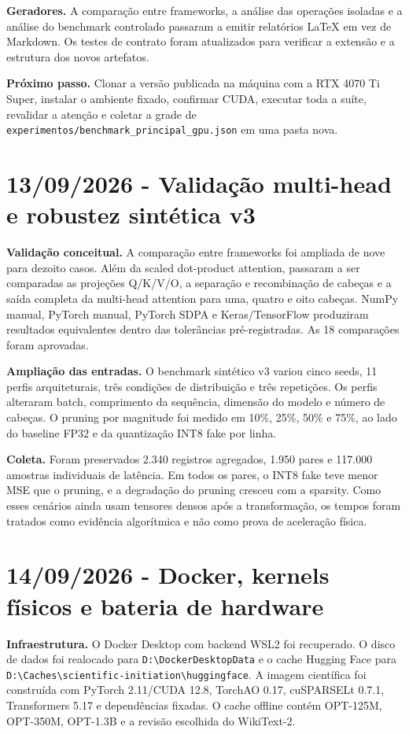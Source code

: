 \textbf{Geradores.} A comparação entre frameworks, a análise das operações
isoladas e a análise do benchmark controlado passaram a emitir relatórios LaTeX
em vez de Markdown. Os testes de contrato foram atualizados para verificar a
extensão e a estrutura dos novos artefatos.

\textbf{Próximo passo.} Clonar a versão publicada na máquina com a RTX 4070 Ti
Super, instalar o ambiente fixado, confirmar CUDA, executar toda a suíte,
revalidar a atenção e coletar a grade de
\texttt{experimentos/benchmark\_\allowbreak{}principal\_\allowbreak{}gpu.json} em uma pasta nova.

\section{13/09/2026 - Validação multi-head e robustez sintética v3}

\textbf{Validação conceitual.} A comparação entre frameworks foi ampliada de
nove para dezoito casos. Além da scaled dot-product attention, passaram a ser
comparadas as projeções Q/K/V/O, a separação e recombinação de cabeças e a saída
completa da multi-head attention para uma, quatro e oito cabeças. NumPy manual,
PyTorch manual, PyTorch SDPA e Keras/TensorFlow produziram resultados
equivalentes dentro das tolerâncias pré-registradas. As 18 comparações foram
aprovadas.

\textbf{Ampliação das entradas.} O benchmark sintético v3 variou cinco seeds,
11 perfis arquiteturais, três condições de distribuição e três repetições. Os
perfis alteraram batch, comprimento da sequência, dimensão do modelo e número
de cabeças. O pruning por magnitude foi medido em 10\%, 25\%, 50\% e 75\%, ao
lado do baseline FP32 e da quantização INT8 fake por linha.

\textbf{Coleta.} Foram preservados 2.340 registros agregados, 1.950 pares e
117.000 amostras individuais de latência. Em todos os pares, o INT8 fake teve
menor MSE que o pruning, e a degradação do pruning cresceu com a sparsity. Como
esses cenários ainda usam tensores densos após a transformação, os tempos foram
tratados como evidência algorítmica e não como prova de aceleração física.

\section{14/09/2026 - Docker, kernels físicos e bateria de hardware}

\textbf{Infraestrutura.} O Docker Desktop com backend WSL2 foi recuperado. O
disco de dados foi realocado para \texttt{D:\textbackslash DockerDesktopData} e
o cache Hugging Face para
\texttt{D:\textbackslash Caches\textbackslash scientific-initiation\textbackslash huggingface}.
A imagem científica foi construída com PyTorch 2.11/CUDA 12.8, TorchAO 0.17,
cuSPARSELt 0.7.1, Transformers 5.17 e dependências fixadas. O cache offline
contém OPT-125M, OPT-350M, OPT-1.3B e a revisão escolhida do WikiText-2.


